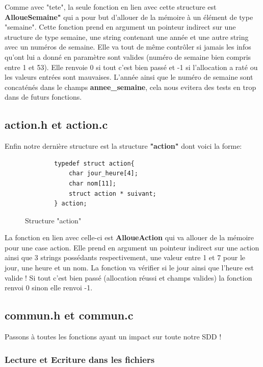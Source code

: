 \documentclass[12pt,french]{article} %
\begin{document}
Comme avec "tete", la seule fonction en lien avec cette structure est \textbf{AlloueSemaine"} qui a pour but d'allouer de la mémoire à un élément de type "semaine". Cette fonction prend en argument un pointeur indirect sur une structure de type semaine, une string contenant une année et une autre string avec un numéros de semaine. Elle va tout de même contrôler si jamais les infos qu'ont lui a donné en paramètre sont valides (numéro de semaine bien compris entre 1 et 53).  Elle renvoie 0 si tout c'est bien passé et -1 si l'allocation a raté ou les valeurs entrées sont mauvaises. L'année ainsi que le numéro de semaine sont concaténés dans le champs \textbf{annee\_semaine}, cela nous evitera des tests en trop dans de futurs fonctions.

\subsection{action.h et action.c}
Enfin notre dernière structure est la structure \textbf{"action"} dont voici la forme:

\begin{figure}[H]
	\begin{lstlisting}
		typedef struct action{
			char jour_heure[4];
			char nom[11];
			struct action * suivant;
		} action;
	\end{lstlisting}
	\caption{Structure "action"}
\end{figure}

La fonction en lien avec celle-ci est \textbf{AlloueAction} qui va allouer de la mémoire pour une case action. Elle prend en argument un pointeur indirect sur une action ainsi que 3 strings possédants respectivement, une valeur entre 1 et 7 pour le jour, une heure et un nom. La fonction va vérifier si le jour ainsi que l'heure est valide ! Si tout c'est bien passé (allocation réussi et champs valides) la fonction renvoi 0 sinon elle renvoi -1.

\subsection{commun.h et commun.c}

Passons à toutes les fonctions ayant un impact sur toute notre SDD !

\subsubsection{Lecture et Ecriture dans les fichiers}
\end{document}
